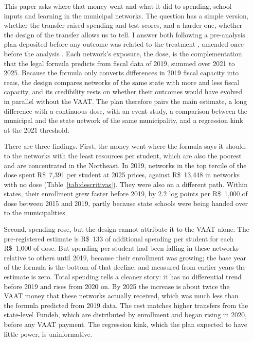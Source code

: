 \documentclass[12pt,letterpaper]{article}
\newcommand{\reais}{R\$}
\begin{document}
This paper asks where that money went and what it did to spending, school inputs and learning in the municipal networks. The question has a simple version, whether the transfer raised spending and test scores, and a harder one, whether the design of the transfer allows us to tell. I answer both following a pre-analysis plan deposited before any outcome was related to the treatment \citep{cunha2026pap}, amended once before the analysis \citep{cunha2026add}. Each network's exposure, the dose, is the complementation that the legal formula predicts from fiscal data of 2019, summed over 2021 to 2025. Because the formula only converts differences in 2019 fiscal capacity into reais, the design compares networks of the same state with more and less fiscal capacity, and its credibility rests on whether their outcomes would have evolved in parallel without the VAAT. The plan therefore pairs the main estimate, a long difference with a continuous dose, with an event study, a comparison between the municipal and the state network of the same municipality, and a regression kink at the 2021 threshold.

There are three findings. First, the money went where the formula says it should: to the networks with the least resources per student, which are also the poorest and are concentrated in the Northeast. In 2019, networks in the top tercile of the dose spent \reais{}~7,391 per student at 2025 prices, against \reais{}~13,448 in networks with no dose (Table~\ref{tab:descritivas}). They were also on a different path. Within states, their enrollment grew faster before 2019, by 2.2 log points per \reais{}~1,000 of dose between 2015 and 2019, partly because state schools were being handed over to the municipalities.

Second, spending rose, but the design cannot attribute it to the VAAT alone. The pre-registered estimate is \reais{}~133 of additional spending per student for each \reais{}~1,000 of dose. But spending per student had been falling in these networks relative to others until 2019, because their enrollment was growing; the base year of the formula is the bottom of that decline, and measured from earlier years the estimate is zero. Total spending tells a cleaner story: it has no differential trend before 2019 and rises from 2020 on. By 2025 the increase is about twice the VAAT money that these networks actually received, which was much less than the formula predicted from 2019 data. The rest matches higher transfers from the state-level Fundeb, which are distributed by enrollment and began rising in 2020, before any VAAT payment. The regression kink, which the plan expected to have little power, is uninformative.
\end{document}
